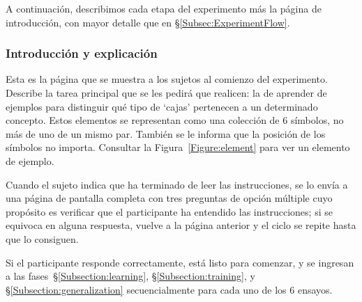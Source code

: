 A continuación, describimos cada etapa del experimento más la página de introducción, con mayor detalle que en \S\ref{Subsec:ExperimentFlow}.

\subsubsection{Introducción y explicación}

Esta es la página que se muestra a los sujetos al comienzo del experimento. Describe la tarea principal que se les pedirá que realicen: la de aprender de ejemplos para distinguir qué tipo de `cajas' pertenecen a un determinado concepto. Estos elementos se representan como una colección de 6 símbolos, no más de uno de un mismo par. También se le informa que la posición de los símbolos no importa. Consultar la Figura~\ref{Figure:element} para ver un elemento de ejemplo.

Cuando el sujeto indica que ha terminado de leer las instrucciones, se lo envía a una página de pantalla completa con tres preguntas de opción múltiple cuyo propósito es verificar que el participante ha entendido las instrucciones; si se equivoca en alguna respuesta, vuelve a la página anterior y el ciclo se repite hasta que lo consiguen.

Si el participante responde correctamente, está listo para comenzar, y se ingresan a las fases~\S\ref{Subsection:learning}, \S\ref{Subsection:training}, y \S\ref{Subsection:generalization} secuencialmente para cada uno de los 6 ensayos.

